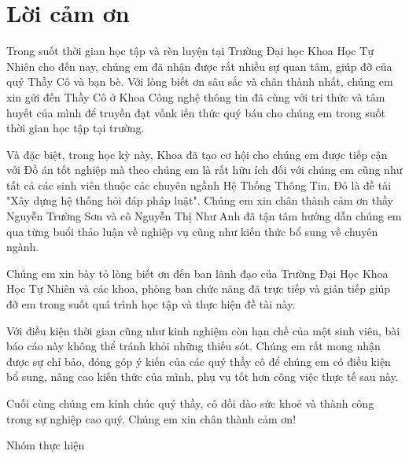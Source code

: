 \chapter*{\centering Lời cảm ơn}
\label{thanks}

Trong suốt thời gian học tập và rèn luyện tại Trường Đại học Khoa Học Tự Nhiên cho đến nay, chúng em đã nhận được rất nhiều sự quan tâm, giúp đỡ của quý Thầy Cô và bạn bè. Với lòng biết ơn sâu sắc và chân thành nhất, chúng em xin gửi đến Thầy Cô ở Khoa Công nghệ thông tin đã cùng với tri thức và tâm huyết của mình để truyền đạt vốnk iến thức quý báu cho chúng em trong suốt thời gian học tập tại trường.

Và đặc biệt, trong học kỳ này, Khoa đã tạo cơ hội cho chúng em được tiếp cận với Đồ án tốt nghiệp mà theo chúng em là rất hữu ích đối với chúng em cũng như tất cả các sinh viên thuộc các chuyên ngầnh Hệ Thống Thông Tin. Đó là đề tài "Xây dựng hệ thống hỏi đáp pháp luật". Chúng em xin chân thành cảm ơn thầy Nguyễn Trường Sơn và cô Nguyễn Thị Như Anh đã tận tâm hướng dẫn chúng em qua từng buổi thảo luận về nghiệp vụ cũng như kiến thức bổ sung về chuyên ngành.

Chúng em xin bày tỏ lòng biết ơn đến ban lãnh đạo của Trường Đại Học Khoa Học Tự Nhiên và các khoa, phòng ban chức năng đã trực tiếp và gián tiếp giúp đỡ em trong suốt quá trình học tập và thực hiện đề tài này.

Với điều kiện thời gian cũng như kinh nghiệm còn hạn chế của một sinh viên, bài báo cáo này không thể tránh khỏi những thiếu sót. Chúng em rất mong nhận được sự chỉ bảo, đóng góp ý kiến của các quý thầy cô để chúng em có điều kiện bổ sung, nâng cao kiến thức của mình, phụ vụ tốt hơn công việc thực tế sau này.

Cuối cùng chúng em kính chúc quý thầy, cô dồi dào sức khoẻ và thành công trong sự nghiệp cao quý. Chúng em xin chân thành cảm ơn!

\begin{flushright}
	Nhóm thực hiện
\end{flushright}